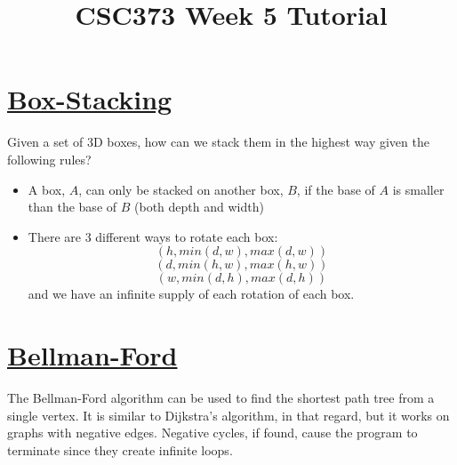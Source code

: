 \documentclass[]{article}
\title{CSC373 Week 5 Tutorial}
\author{}
\begin{document}
\maketitle

\section{\href{http://www.geeksforgeeks.org/dynamic-programming-set-21-box-stacking-problem/}{Box-Stacking}}
Given a set of 3D boxes, how can we stack them in the highest way given the following rules?
\begin{itemize}
	\item A box, $A$, can only be stacked on another box, $B$,  if the base of $A$ is smaller than the base of $B$ (both depth and width)
	\item There are 3 different ways to rotate each box: \[(h,min(d,w),max(d,w))\] 
	\[(d,min(h,w),max(h,w))\]
	\[(w,min(d,h),max(d,h))\] 
	and we have an infinite supply of each rotation of each box.
\end{itemize}

\section{\href{https://web.stanford.edu/class/archive/cs/cs161/cs161.1138/lectures/18/Small18.pdf}{Bellman-Ford}}
The Bellman-Ford algorithm can be used to find the shortest path tree from a single vertex. It is similar to Dijkstra's algorithm, in that regard, but it works on graphs with negative edges. Negative cycles, if found, cause the program to terminate since they create infinite loops.
\end{document}
